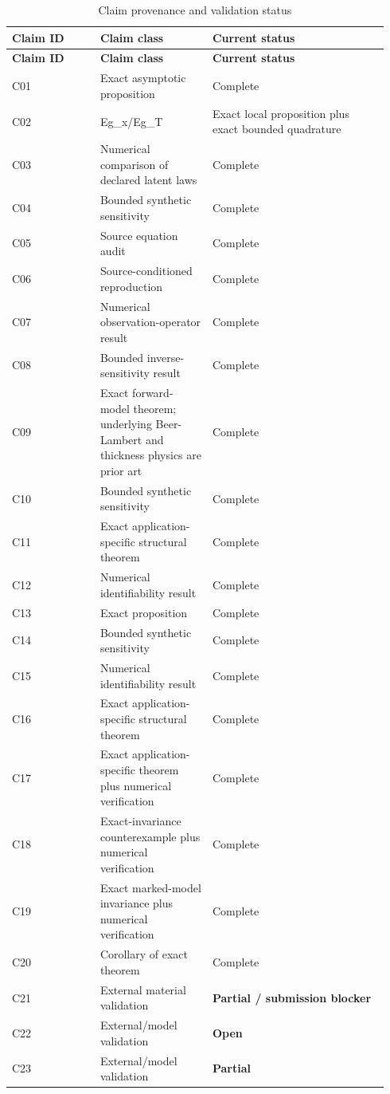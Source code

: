 \documentclass[12pt]{article}
\begin{document}
\begingroup
\scriptsize
\begin{longtable}{@{}p{0.220\linewidth}p{0.280\linewidth}p{0.440\linewidth}@{}}
\caption{Claim provenance and validation status}\\
\toprule
\textbf{Claim ID} & \textbf{Claim class} & \textbf{Current status} \\
\midrule
\endfirsthead
\toprule
\textbf{Claim ID} & \textbf{Claim class} & \textbf{Current status} \\
\midrule
\endhead
C01 & Exact asymptotic proposition & Complete \\
C02 & Eg\_x/Eg\_T & Exact local proposition plus exact bounded quadrature \\
C03 & Numerical comparison of declared latent laws & Complete \\
C04 & Bounded synthetic sensitivity & Complete \\
C05 & Source equation audit & Complete \\
C06 & Source-conditioned reproduction & Complete \\
C07 & Numerical observation-operator result & Complete \\
C08 & Bounded inverse-sensitivity result & Complete \\
C09 & Exact forward-model theorem; underlying Beer-Lambert and thickness physics are prior art & Complete \\
C10 & Bounded synthetic sensitivity & Complete \\
C11 & Exact application-specific structural theorem & Complete \\
C12 & Numerical identifiability result & Complete \\
C13 & Exact proposition & Complete \\
C14 & Bounded synthetic sensitivity & Complete \\
C15 & Numerical identifiability result & Complete \\
C16 & Exact application-specific structural theorem & Complete \\
C17 & Exact application-specific theorem plus numerical verification & Complete \\
C18 & Exact-invariance counterexample plus numerical verification & Complete \\
C19 & Exact marked-model invariance plus numerical verification & Complete \\
C20 & Corollary of exact theorem & Complete \\
C21 & External material validation & \textbf{Partial / submission blocker} \\
C22 & External/model validation & \textbf{Open} \\
C23 & External/model validation & \textbf{Partial} \\
\bottomrule
\end{longtable}
\endgroup
\end{document}
